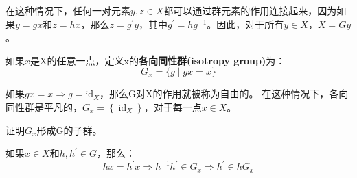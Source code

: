 在这种情况下，任何一对元素$y, z \in X$都可以通过群元素的作用连接起来，因为如果$y=g x$和$z=h x$，那么$z=g^{\prime} y$，其中$g^{\prime}=h g^{-1}$。因此，对于所有$y \in X$，$X=G y$。 

如果$x$是X的任意一点，定义x的\textbf{各向同性群(isotropy group)}为： 
$$
G_{x}=\{g\mid g x=x\}
$$ 

如果$g x=x \Longrightarrow g=\mathrm{id}_{X}$，那么G对X的作用就被称为自由的。 在这种情况下，各向同性群是平凡的，$G_{x}=\left\{\operatorname{id}_{X}\right\}$，对于每一点$x \in X$。 
\begin{exercise}
    证明$G_{x}$形成G的子群。
\end{exercise}

如果$x \in X$和$h, h^{\prime} \in G$，那么： 
$$
h x=h^{\prime} x \Longrightarrow h^{-1} h^{\prime} \in G_{x} \Longrightarrow h^{\prime} \in h G_{x}
$$ 

